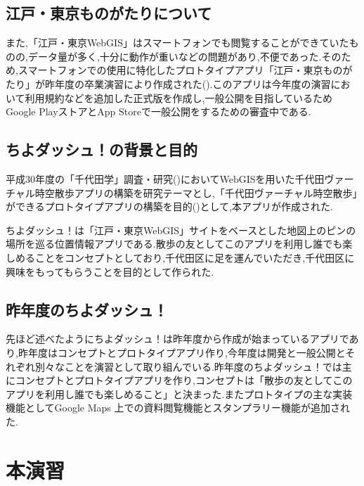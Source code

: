 \documentclass[a4paper, twoside]{jarticle}
\begin{document}
\begin{multicols}{2}
\subsection{江戸・東京ものがたりについて}
また,「江戸・東京WebGIS」はスマートフォンでも閲覧することができていたものの,データ量が多く,十分に動作が重いなどの問題があり,不便であった.そのため,スマートフォンでの使用に特化したプロトタイプアプリ「江戸・東京ものがたり」が昨年度の卒業演習により作成された(\cite{houkokusyo_30}).このアプリは今年度の演習において利用規約などを追加した正式版を作成し,一般公開を目指しているためGoogle PlayストアとApp Storeで一般公開をするための審査中である.

\subsection{ちよダッシュ！の背景と目的}
平成30年度の「千代田学」調査・研究(\cite{tiyokenkyu})においてWebGISを用いた千代田ヴァーチャル時空散歩アプリの構築を研究テーマとし,「千代田ヴァーチャル時空散歩」ができるプロトタイプアプリの構築を目的(\cite{tiyodagaku_houkokusyo})として,本アプリが作成された.

ちよダッシュ！は「江戸・東京WebGIS」サイトをベースとした地図上のピンの場所を巡る位置情報アプリである.散歩の友としてこのアプリを利用し誰でも楽しめることをコンセプトとしており,千代田区に足を運んでいただき,千代田区に興味をもってもらうことを目的として作られた.

\subsection{昨年度のちよダッシュ！}
先ほど述べたようにちよダッシュ！は昨年度から作成が始まっているアプリであり,昨年度はコンセプトとプロトタイプアプリ作り,今年度は開発と一般公開とそれぞれ別々なことを演習として取り組んでいる.昨年度のちよダッシュ！では主にコンセプトとプロトタイプアプリを作り,コンセプトは「散歩の友としてこのアプリを利用し誰でも楽しめること」と決まった.またプロトタイプの主な実装機能としてGoogle Maps 上での資料閲覧機能とスタンプラリー機能が追加された.


\section{本演習}



\end{multicols}
\end{document}
